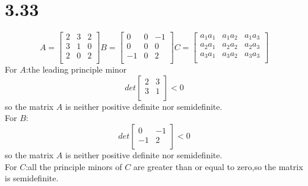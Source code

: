 \documentclass{article}
\begin{document}
\section*{3.33}
\[A=
\left[
\begin{array}{ccc}
2 & 3 & 2\\
3 & 1 & 0\\
2 & 0 & 2\\
\end{array}
\right]
B=
\left[
\begin{array}{ccc}
0 & 0 & -1\\
0 & 0 & 0\\
-1 & 0 & 2\\
\end{array}
\right]
C=
\left[
\begin{array}{ccc}
a_1a_1 & a_1a_2 & a_1a_3\\
a_2a_1 & a_2a_2 & a_2a_3\\
a_3a_1 & a_3a_2 & a_3a_3\\
\end{array}
\right]
\]
For $A$:the leading principle minor
\[det
\left[
\begin{array}{cc}
2 & 3\\
3 & 1\\
\end{array}
\right]<0
\]
so the matrix $A$ is neither positive definite nor semidefinite.\\
For $B$:
\[det
\left[
\begin{array}{cc}
0 & -1\\
-1 & 2\\
\end{array}
\right]<0
\]
so the matrix $A$ is neither positive definite nor semidefinite.
\\
For $C$:all the principle minors of $C$ are greater than or equal to zero,so the matrix is semidefinite.\\
\end{document}
